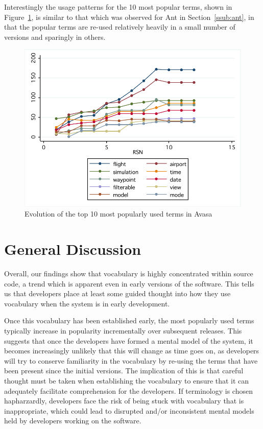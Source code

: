 Interestingly the usage patterns for the 10 most popular terms, shown in Figure~\ref{fig:vocab-popular-terms-avasa}, is similar to that which was observed for Ant in Section~\ref{ssub:ant}, in that the popular terms are re-used relatively heavily in a small number of versions and sparingly in others.

\begin{figure}[t]
\centering
\includegraphics[width=\textwidth]{Figures/Vocab-AvasaPopular.pdf}
\caption{Evolution of the top 10 most popularly used terms in Avasa}
\label{fig:vocab-popular-terms-avasa}
\end{figure}




\section{General Discussion} %
\label{sec:general_discussion}

Overall, our findings show that vocabulary is highly concentrated within source code, a trend which is apparent even in early versions of the software. This tells us that developers place at least some guided thought into how they use vocabulary when the system is in early development. 

Once this vocabulary has been established early, the most popularly used terms typically increase in popularity incrementally over subsequent releases. This suggests that once the developers have formed a mental model of the system, it becomes increasingly unlikely that this will change as time goes on, as developers will try to conserve familiarity in the vocabulary by re-using the terms that have been present since the initial versions. The implication of this is that careful thought must be taken when establishing the vocabulary to ensure that it can adequately facilitate comprehension for the developers. If terminology is chosen hapharzardly, developers face the risk of being stuck with vocabulary that is inappropriate, which could lead to disrupted and/or inconsistent mental models held by developers working on the software.

